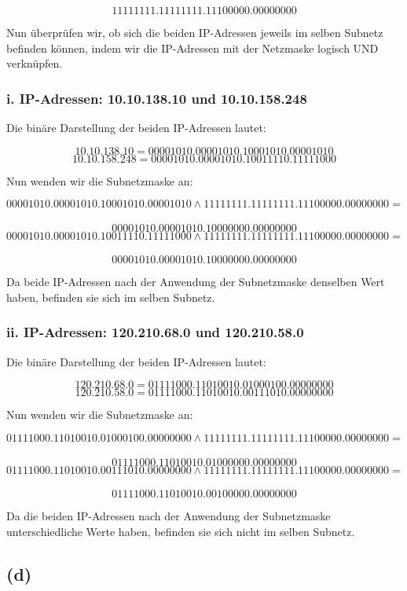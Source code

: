 \documentclass[a4paper]{scrartcl}
\begin{document}
\[
11111111.11111111.11100000.00000000
\]

Nun überprüfen wir, ob sich die beiden IP-Adressen jeweils im selben Subnetz befinden können, indem wir die IP-Adressen mit der Netzmaske logisch UND verknüpfen.

\subsubsection*{i. IP-Adressen: 10.10.138.10 und 10.10.158.248}

Die binäre Darstellung der beiden IP-Adressen lautet:

\[
10.10.138.10 = 00001010.00001010.10001010.00001010
\]
\[
10.10.158.248 = 00001010.00001010.10011110.11111000
\]

Nun wenden wir die Subnetzmaske an:

\[
00001010.00001010.10001010.00001010 \land 11111111.11111111.11100000.00000000 = \] \\
\[
00001010.00001010.10000000.00000000
\]
\[
00001010.00001010.10011110.11111000 \land 11111111.11111111.11100000.00000000 = \] \\
\[
00001010.00001010.10000000.00000000
\]

Da beide IP-Adressen nach der Anwendung der Subnetzmaske denselben Wert haben, befinden sie sich im selben Subnetz.

\subsubsection*{ii. IP-Adressen: 120.210.68.0 und 120.210.58.0}

Die binäre Darstellung der beiden IP-Adressen lautet:

\[
120.210.68.0 = 01111000.11010010.01000100.00000000
\]
\[
120.210.58.0 = 01111000.11010010.00111010.00000000
\]

Nun wenden wir die Subnetzmaske an:

\[
01111000.11010010.01000100.00000000 \land 11111111.11111111.11100000.00000000 = \] \\
\[
01111000.11010010.01000000.00000000
\]
\[
01111000.11010010.00111010.00000000 \land 11111111.11111111.11100000.00000000 = \] \\
\[
01111000.11010010.00100000.00000000
\]

Da die beiden IP-Adressen nach der Anwendung der Subnetzmaske unterschiedliche Werte haben, befinden sie sich nicht im selben Subnetz.

\subsection*{(d)}
\end{document}

